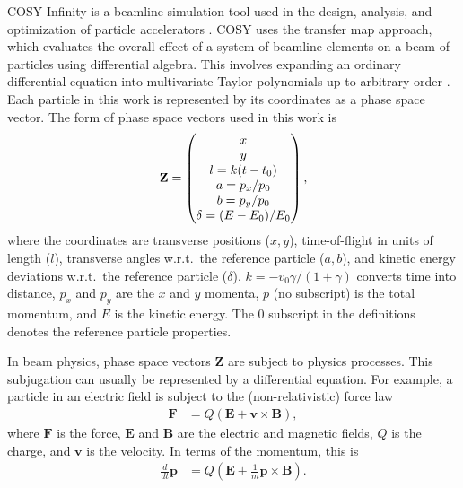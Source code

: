 \label{sec:cosy}\par
COSY Infinity is a beamline simulation tool used in the design, analysis, and optimization of particle accelerators \cite{cosy}. COSY uses the transfer map approach, which evaluates the overall effect of a system of beamline elements on a beam of particles using differential algebra. This involves expanding an ordinary differential equation into multivariate Taylor polynomials up to arbitrary order \cite{modernMapMethods}. Each particle in this work is represented by its coordinates as a phase space vector. The form of phase space vectors used in this work is
\begin{equation}
\centering
\mathbf{Z}=
\begin{pmatrix}
x\\ y\\ l=k(t-t_0)\\a=p_x/p_0\\b=p_y/p_0\\  \delta = (E-E_0)/E_0
\end{pmatrix},
\label{eqn:phaseSpaceVector}
\end{equation}
where the coordinates are transverse positions ($x, y$), time-of-flight in units of length ($l$), transverse angles w.r.t.\ the reference particle ($a, b$), and kinetic energy deviations w.r.t.\ the reference particle ($\delta$). $k=-v_0\gamma/(1+\gamma)$ converts time into distance, $p_x$ and $p_y$ are the $x$ and $y$ momenta, $p$ (no subscript) is the total momentum, and $E$ is the kinetic energy. The $0$ subscript in the definitions denotes the reference particle properties.

In beam physics, phase space vectors $\mathbf{Z}$ are subject to physics processes. This subjugation can usually be represented by a differential equation. For example, a particle in an electric field is subject to the (non-relativistic) force law \cite{griffithsem}
\begin{align}\nonumber
\mathbf{F}&=Q(\mathbf{E}+\mathbf{v}\times \mathbf{B}),
\end{align}
where $\mathbf{F}$ is the force, $\mathbf{E}$ and $\mathbf{B}$ are the electric and magnetic fields, $Q$ is the charge, and $\mathbf{v}$ is the velocity. In terms of the momentum, this is
\begin{align}\nonumber
\frac{d}{dt}\mathbf{p}&=Q(\mathbf{E}+\frac{1}{m}\mathbf{p}\times \mathbf{B}).
\end{align}

